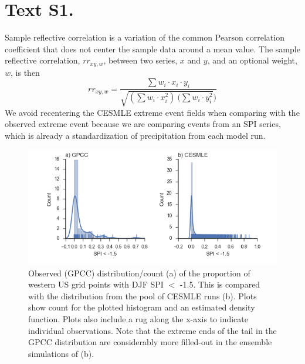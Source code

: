 \documentclass[final, double]{ua-thesis}
\begin{document}


\section*{Text S1.}

Sample reflective correlation is a variation of the common Pearson correlation coefficient that does not center the sample data around a mean value. The sample reflective correlation, $rr_{xy,w}$, between two series, $x$ and $y$, and an optional weight, $w$, is then
\begin{equation}
rr_{xy,w} = \frac{
\displaystyle\sum w_i \cdot x_i \cdot y_i}{\sqrt{(
\displaystyle\sum w_i \cdot x^{2}_i) ~ (
\displaystyle\sum w_i \cdot y^{2}_i})}
\end{equation}
We avoid recentering the CESMLE extreme event fields when comparing with the observed extreme event because we are comparing events from an SPI series, which is already a standardization of precipitation from each model run.

\begin{figure}[ht]
\centering
\centerline{\includegraphics[width=6.5in]{p3figures/fig_spi_distribution.png}}
\caption{Observed (GPCC) distribution/count (a) of the proportion of western US grid points with DJF SPI $<$ -1.5. This is compared with the distribution from the pool of CESMLE runs (b). Plots show count for the plotted histogram and an estimated density function. Plots also include a rug along the x-axis to indicate individual observations. Note that the extreme ends of the tail in the GPCC distribution are considerably more filled-out in the ensemble simulations of (b).}
\label{sfig_spi_distribution}
\end{figure}
\end{document}
